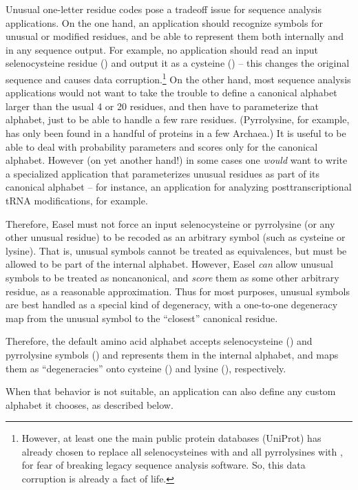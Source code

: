 Unusual one-letter residue codes pose a tradeoff issue for sequence
analysis applications. On the one hand, an application should
recognize symbols for unusual or modified residues, and be able to
represent them both internally and in any sequence output. For
example, no application should read an input selenocysteine residue
() and output it as a cysteine () -- this changes
the original sequence and causes data corruption.\footnote{However, at
least one the main public protein databases (UniProt) has already
chosen to replace all selenocysteines with  and all
pyrrolysines with , for fear of breaking legacy sequence
analysis software.  So, this data corruption is already a fact of
life.}  On the other hand, most sequence analysis applications would
not want to take the trouble to define a canonical alphabet larger
than the usual 4 or 20 residues, and then have to parameterize that
alphabet, just to be able to handle a few rare residues. (Pyrrolysine,
for example, has only been found in a handful of proteins in a few
Archaea.) It is useful to be able to deal with probability parameters
and scores only for the canonical alphabet. However (on yet another
hand!) in some cases one \emph{would} want to write a specialized
application that parameterizes unusual residues as part of its
canonical alphabet -- for instance, an application for analyzing
posttranscriptional tRNA modifications, for example.

Therefore, Easel must not force an input selenocysteine or pyrrolysine
(or any other unusual residue) to be recoded as an arbitrary symbol
(such as cysteine or lysine). That is, unusual symbols cannot be
treated as equivalences, but must be allowed to be part of the
internal alphabet.  However, Easel \emph{can} allow unusual symbols to
be treated as noncanonical, and \emph{score} them as some other
arbitrary residue, as a reasonable approximation. Thus for most
purposes, unusual symbols are best handled as a special kind of
degeneracy, with a one-to-one degeneracy map from the unusual symbol
to the ``closest'' canonical residue.

Therefore, the default amino acid alphabet accepts selenocysteine
() and pyrrolysine symbols () and represents them in
the internal alphabet, and maps them as ``degeneracies'' onto cysteine
() and lysine (), respectively.

When that behavior is not suitable, an application can also define any
custom alphabet it chooses, as described below.


